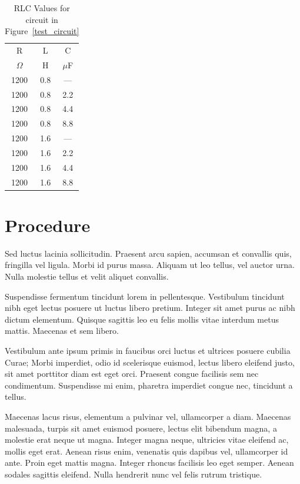 \documentclass{article}
\begin{document}
\begin{table}[h!]
  \begin{center}
    \begin{tabular}{ccc}
      \hline
      R & L & C \\
      \(\Omega\) & H & \(\mu\)F \\
      \hline
      1200 & 0.8 & --- \\ 1200 & 0.8 & 2.2 \\ 1200 & 0.8 & 4.4 \\
      1200 & 0.8 & 8.8 \\ 1200 & 1.6 & --- \\ 1200 & 1.6 & 2.2 \\
      1200 & 1.6 & 4.4 \\ 1200 & 1.6 & 8.8 \\
      \hline
    \end{tabular}
    \caption{RLC Values for circuit in Figure~\ref{test_circuit}}
    \label{testc_dat}
  \end{center}
\end{table}

\section{Procedure}
Sed luctus lacinia sollicitudin. Praesent arcu sapien, accumsan et convallis
quis, fringilla vel ligula. Morbi id purus massa. Aliquam ut leo tellus, vel
auctor urna. Nulla molestie tellus et velit aliquet convallis.

Suspendisse fermentum tincidunt lorem in pellentesque. Vestibulum tincidunt
nibh eget lectus posuere ut luctus libero pretium. Integer sit amet purus ac
nibh dictum elementum. Quisque sagittis leo eu felis mollis vitae interdum
metus mattis. Maecenas et sem libero.

Vestibulum ante ipsum primis in faucibus orci luctus et ultrices posuere
cubilia Curae; Morbi imperdiet, odio id scelerisque euismod, lectus libero
eleifend justo, sit amet porttitor diam est eget orci. Praesent congue
facilisis sem nec condimentum. Suspendisse mi enim, pharetra imperdiet congue
nec, tincidunt a tellus.

Maecenas lacus risus, elementum a pulvinar vel, ullamcorper a diam. Maecenas
malesuada, turpis sit amet euismod posuere, lectus elit bibendum magna, a
molestie erat neque ut magna. Integer magna neque, ultricies vitae eleifend ac,
mollis eget erat. Aenean risus enim, venenatis quis dapibus vel, ullamcorper id
ante. Proin eget mattis magna. Integer rhoncus facilisis leo eget semper.
Aenean sodales sagittis eleifend. Nulla hendrerit nunc vel felis rutrum
tristique. 
\end{document}
